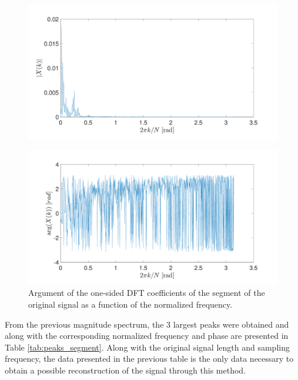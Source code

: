 \documentclass[a4paper, oneside, 11pt]{article}
\begin{document}
\begin{figure}[H]
	\centering
	\begin{minipage}[b]{.49\textwidth}
		\centering
		\includegraphics[width=\textwidth]{figures/mag_segment.pdf}
		\label{fig:mag_segment}
	\end{minipage}
	\hfill
	\begin{minipage}[b]{.49\textwidth}
		\centering
		\includegraphics[width=\textwidth]{figures/phase_segment.pdf}
		\caption{Argument of the one-sided DFT coefficients of the segment of the original signal as a function of the normalized frequency.}
		\label{fig:phase_segment}
	\end{minipage}
\end{figure}

From the previous magnitude spectrum, the 3 largest peaks were obtained and along with the corresponding normalized frequency and phase are presented in Table \ref{tab:peaks_segment}. Along with the original signal length and sampling frequency, the data presented in the previous table is the only data necessary to obtain a possible reconstruction of the signal through this method.
\end{document}
